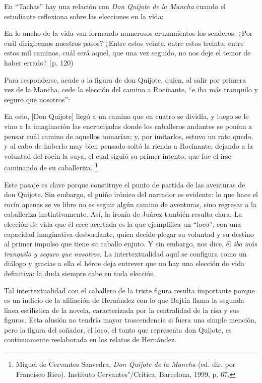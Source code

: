\documentclass[14pt,twoside,final]{extbook} %
\let\oldfootnote\footnote
\renewcommand\footnote[1]{%
\oldfootnote{\hspace{1mm}#1}}
\begin{document}
En ``Tachas'' hay una relación con \emph{Don Quijote de la Mancha} cuando el estudiante reflexiona sobre las elecciones en la vida:
\begin{quoting}
En lo ancho de la vida van formando numerosos cruzamientos los senderos. ¿Por cuál dirigiremos nuestros pasos? ¿Entre estos veinte, entre estos treinta, entre estos mil caminos, cuál será aquel, que una vez seguido, no nos deje el temor de haber errado? (p. 120)
\end{quoting}
Para responderse, acude a la figura de don Quijote, quien, al salir por primera vez de la Mancha, cede la elección del camino a Rocinante, ``e iba más tranquilo y seguro que nosotros'':
\begin{quoting}
En esto, [Don Quijote] llegó a un camino que en cuatro se dividía, y luego se le vino a la imaginación las encrucijadas donde los caballeros andantes se ponían a pensar cuál camino de aquellos
tomarían; y, por imitarlos, estuvo un rato quedo, y al cabo de haberlo muy bien pensado soltó la rienda a Rocinante, dejando a la voluntad del rocín la suya, el cual siguió su primer intento, que fue el irse caminando de su caballeriza.\footnote{Miguel de Cervantes Saavedra, \emph{Don Quijote de la Mancha} (ed. dir. por Francisco Rico). Instituto Cervantes"/Crítica, Barcelona, 1999, p. 67.}
\end{quoting}
Este pasaje es clave porque constituye el punto de partida de las aventuras de don Quijote. Sin embargo, el guiño irónico del narrador es evidente: lo que hace el rocín apenas se ve libre no es seguir algún camino de aventuras, sino regresar a la caballeriza instintivamente. Así, la ironía de Juárez también resulta clara. La elección de vida que él cree acertada es la que ejemplifica un ``loco'', con una capacidad imaginativa desbordante, quien decide plegar su voluntad y su destino al primer impulso que tiene su caballo enjuto. Y sin embargo, nos dice, él \emph{iba más tranquilo y seguro que nosotros.} La intertextualidad aquí se configura como un diálogo y gracias a ella el héroe deja entrever que
no hay una elección de vida definitiva: la duda siempre cabe en toda elección.

Tal intertextualidad con el caballero de la triste figura resulta importante porque es un indicio de la afiliación de Hernández con lo que Bajtín llama la segunda línea estilística de la novela, caracterizada por la centralidad de la risa y sus figuras. Esta alusión no tendría mayor trascendencia si fuera una simple mención, pero la figura del soñador, el loco, el tonto que representa don Quijote, es continuamente reelaborada en los relatos de Hernández.
\end{document}
